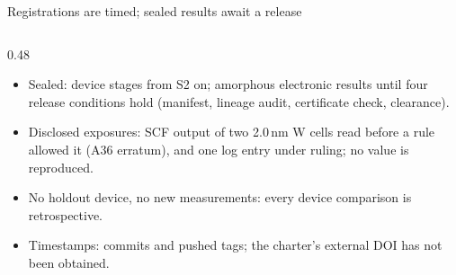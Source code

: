\begin{frame}{Registrations are timed; sealed results await a release}
\begin{columns}[T,onlytextwidth]
\begin{column}{0.48\textwidth}
      \begin{itemize}\scriptsize\setlength{\itemsep}{0.5mm}
        \item Sealed: device stages from S2 on; amorphous electronic results until four release conditions hold (manifest, lineage audit, certificate check, clearance).
        \item Disclosed exposures: SCF output of two 2.0\,nm W cells read before a rule allowed it (A36 erratum), and
          one log entry under ruling; no value is reproduced.
        \item No holdout device, no new measurements: every device comparison is retrospective.
        \item Timestamps: commits and pushed tags; the charter's external DOI has not been obtained.
      \end{itemize}
    \end{column}
  \end{columns}
\end{frame}
